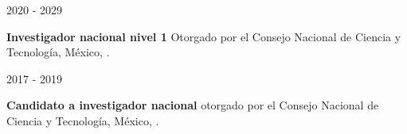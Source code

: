 
\begin{minipage}{1.5 in}
	2020 - 2029\\
\end{minipage}
\begin{minipage}{4.5in}
	\textbf{Investigador nacional nivel 1} Otorgado por el Consejo Nacional de Ciencia y Tecnología, México, \href{https://www.dropbox.com/s/gasskc02vezprb8/2019_sni_vasquez.pdf?dl=0}{\faFilePdfO}.\\ 
\end{minipage}


\begin{minipage}{1.5 in}
	2017 - 2019\\
\end{minipage}
\begin{minipage}{4.5in}
	\textbf{Candidato a investigador nacional} otorgado por el Consejo Nacional de Ciencia y Tecnología, México, \href{https://www.dropbox.com/s/37igr1yucjupmfp/2016_sni_vasquez.pdf?dl=0}{\faFilePdfO}.\\ 
\end{minipage}

